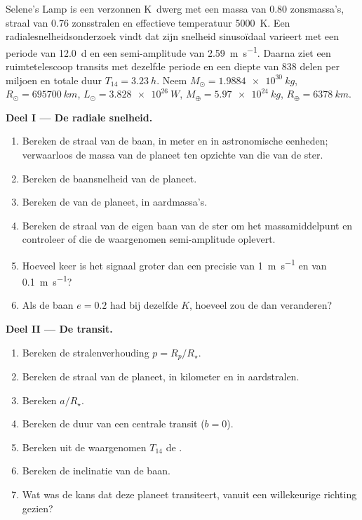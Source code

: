 \begin{problem}
\label{pb:b3:exoplanets:1}
Selene's Lamp is een verzonnen K~dwerg met een massa van 0.80 zonsmassa's, straal
van 0.76 zonsstralen en effectieve temperatuur \qty{5000}{K}. Een
radialesnelheidsonderzoek vindt dat zijn snelheid sinusoïdaal varieert met
een periode van \qty{12.0}{d} en een semi-amplitude van \qty{2.59}{m.s^{-1}}. Daarna
ziet een ruimtetelescoop transits met dezelfde periode en een diepte van
\num{838} delen per miljoen en totale duur $T_{14} = \qty{3.23}{h}$.
Neem $M_\odot = \qty{1.9884e30}{kg}$, $R_\odot = \qty{695700}{km}$,
$L_\odot = \qty{3.828e26}{W}$, $M_\oplus = \qty{5.97e24}{kg}$,
$R_\oplus = \qty{6378}{km}$.

\medskip\noindent\textbf{Deel I --- De radiale snelheid.}
\begin{enumerate}
\item Bereken de straal van de baan, in meter en in astronomische
  eenheden; verwaarloos de massa van de planeet ten opzichte van die van de ster.
\item Bereken de baansnelheid van de planeet.
\item Bereken de  van de planeet, in aardmassa's.
\item Bereken de straal van de eigen baan van de ster om het massamiddelpunt
  en controleer of die de waargenomen semi-amplitude oplevert.
\item Hoeveel keer is het signaal groter dan een precisie van
  \qty{1}{m.s^{-1}} en van \qty{0.1}{m.s^{-1}}?
\item Als de baan $e = 0.2$ had bij dezelfde $K$, hoeveel zou de
   dan veranderen?
\end{enumerate}

\medskip\noindent\textbf{Deel II --- De transit.}
\begin{enumerate}[resume]
\item Bereken de stralenverhouding $p = R_p/R_\star$.
\item Bereken de straal van de planeet, in kilometer en in aardstralen.
\item Bereken $a/R_\star$.
\item Bereken de duur van een centrale transit ($b = 0$).
\item Bereken uit de waargenomen $T_{14}$ de .
\item Bereken de inclinatie van de baan.
\item Wat was de kans dat deze planeet transiteert, vanuit een
  willekeurige richting gezien?
\end{enumerate}


\end{problem}
